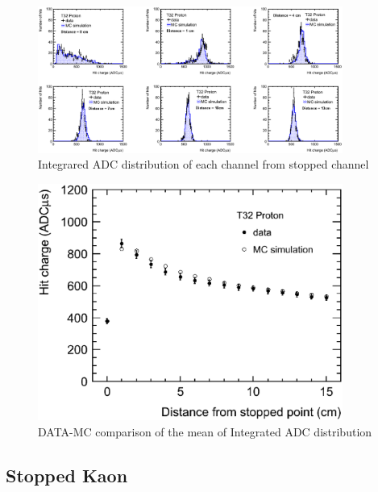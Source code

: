 \begin{figure}[htbp]
  \centering
  \includegraphics[width=10cm,clip]{fig/stop_proton2.eps}
  \caption{Integrared ADC distribution of each channel from stopped channel}
  \label{fig:ADC_distribution}
\end{figure}

\begin{figure}[htbp]
  \centering
  \includegraphics[width=10cm,clip]{fig/stop_proton3.eps}
  \caption{DATA-MC comparison of the mean of Integrated ADC distribution}
  \label{fig:Mean_comparison}
\end{figure}

\subsection{Stopped Kaon}

